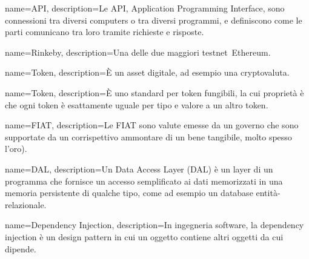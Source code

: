 {
  name={API},
  description={Le API, Application Programming Interface, sono connessioni tra diversi computers o tra diversi programmi, e definiscono come le parti comunicano tra loro tramite richieste e risposte.}
}

{
  name={Rinkeby},
  description={Una delle due maggiori testnet\glo\ Ethereum.}
}

{
  name={Token},
  description={È un asset digitale, ad esempio una cryptovaluta.}
}

{
  name={Token},
  description={È uno standard per token fungibili, la cui proprietà è che ogni token è esattamente uguale per tipo e valore a un altro token.}
}

{
  name={FIAT},
  description={Le FIAT sono valute emesse da un governo che sono supportate da un corrispettivo ammontare di un bene tangibile, molto spesso l'oro).}
}

{
  name={DAL},
  description={Un Data Access Layer (DAL) è un layer di un programma che fornisce un accesso semplificato ai dati memorizzati in una memoria persistente di qualche tipo, come ad esempio un database entità-relazionale.}
}

{
  name={Dependency Injection},
  description={In ingegneria software, la dependency injection è un design pattern in cui un oggetto contiene altri oggetti da cui dipende.}
}